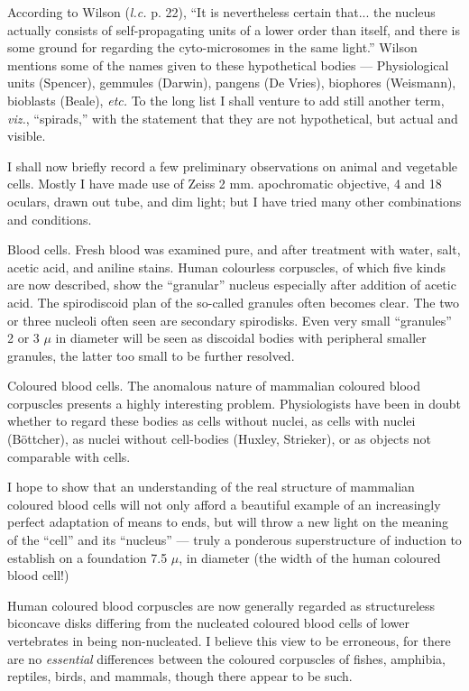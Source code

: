 \documentclass[a4paper, 12pt, oneside]{article}
\begin{document}
According to Wilson (\emph{l.c.} p. 22), ``It is nevertheless certain that... the nucleus actually consists of self-propagating units of a lower order than itself, and there is some ground for regarding the cyto-microsomes in the same light.'' Wilson mentions some of the names given to these hypothetical bodies --- Physiological units (Spencer), gemmules (Darwin), pangens (De Vries), biophores (Weismann), bioblasts (Beale), \emph{etc.} To the long list I shall venture to add still another term, \emph{viz.}, ``spirads,'' with the statement that they are not hypothetical, but actual and visible.

I shall now briefly record a few preliminary observations on animal and vegetable cells. Mostly I have made use of Zeiss 2 mm. apochromatic objective, 4 and 18 oculars, drawn out tube, and dim light; but I have tried many other combinations and conditions.

Blood cells. Fresh blood was examined pure, and after treatment with water, salt, acetic acid, and aniline stains. Human colourless corpuscles, of which five kinds are now described, show the ``granular'' nucleus especially after addition of acetic acid. The spirodiscoid plan of the so-called granules often becomes clear. The two or three nucleoli often seen are secondary spirodisks. Even very small ``granules'' 2 or 3 $\mu$ in diameter will be seen as discoidal bodies with peripheral smaller granules, the latter too small to be further resolved.

Coloured blood cells. The anomalous nature of mammalian coloured blood corpuscles presents a highly interesting problem. Physiologists have been in doubt whether to regard these bodies as cells without nuclei, as cells with nuclei (Böttcher), as nuclei without cell-bodies (Huxley, Strieker), or as objects not comparable with cells.

I hope to show that an understanding of the real structure of mammalian coloured blood cells will not only afford a beautiful example of an increasingly perfect adaptation of means to ends, but will throw a new light on the meaning of the ``cell'' and its ``nucleus'' --- truly a ponderous superstructure of induction to establish on a foundation 7.5 $\mu$, in diameter (the width of the human coloured blood cell!)

Human coloured blood corpuscles are now generally regarded as structureless biconcave disks differing from the nucleated coloured blood cells of lower vertebrates in being non-nucleated. I believe this view to be erroneous, for there are no \emph{essential} differences between the coloured corpuscles of fishes, amphibia, reptiles, birds, and mammals, though there appear to be such.
\end{document}
